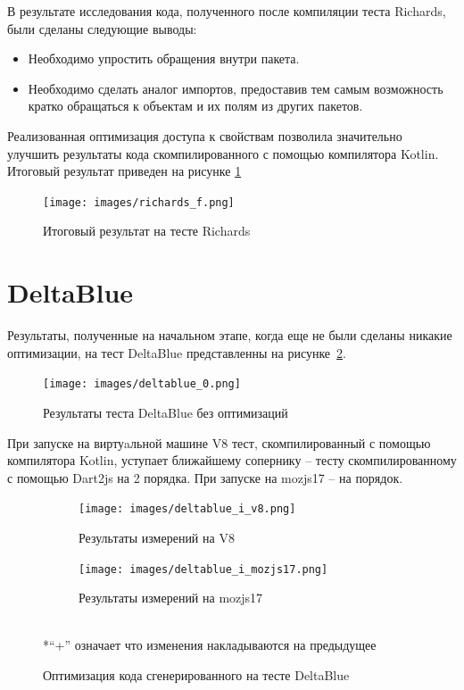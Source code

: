 В результате исследования кода, полученного после компиляции теста Richards, были сделаны следующие выводы:
\begin{itemize}
\item Необходимо упростить обращения внутри пакета.
\item Необходимо сделать аналог импортов, предоставив тем самым возможность кратко обращаться к объектам и их полям из других пакетов.
\end{itemize}

Реализованная оптимизация доступа к свойствам позволила значительно улучшить результаты кода скомпилированного с помощью компилятора Kotlin. Итоговый результат приведен на рисунке \ref{richards_f}

\begin{figure}[ht!]
\centering
\texttt{[image: images/richards\_f.png]}
\caption{Итоговый результат на тесте Richards}
\label{richards_f}
\end{figure}

\section{DeltaBlue}

Результаты, полученные на начальном этапе, когда еще не были сделаны никакие оптимизации, на тест DeltaBlue представленны на рисунке~\ref{deltablue_0}.

\begin{figure}[ht!]
\centering
\texttt{[image: images/deltablue\_0.png]}
\caption{Результаты теста DeltaBlue без оптимизаций}
\label{deltablue_0}
\end{figure}

При запуске на виртуaльной машине V8 тест, скомпилированный с помощью компилятора Kotlin, уступает ближайшему сопернику -- тесту скомпилированному с помощью Dart2js на 2 порядка. При запуске на mozjs17 -- на порядок.

\begin{figure}[ht!]
\centering
	\begin{subfigure}[b]{0.63\textwidth}
	\centering
	\texttt{[image: images/deltablue\_i\_v8.png]}
	\caption{Результаты измерений на V8}
    \end{subfigure}

  	\begin{subfigure}[b]{0.63\textwidth}
	\centering
	\texttt{[image: images/deltablue\_i\_mozjs17.png]}
	\caption{Результаты измерений на mozjs17}
    \end{subfigure}
\\*``+'' означает что изменения накладываются на предыдущее
\caption{Оптимизация кода сгенерированного на тесте DeltaBlue}
\label{deltablue_i}
\end{figure}

